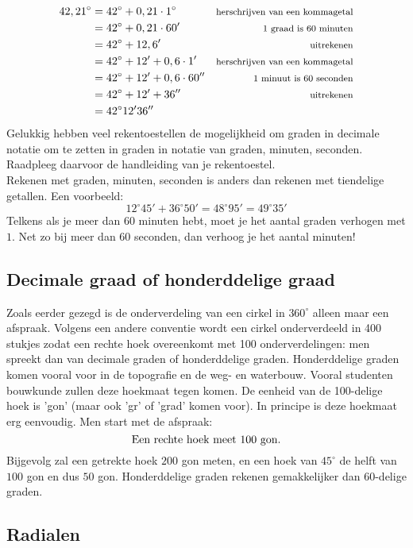 \documentclass[a4paper,12pt]{article}
\begin{document}
\begin{align*}
42,21^\circ &= 42^\circ+0,21\cdot 1^\circ &\textup{\footnotesize herschrijven van een kommagetal}\\
&= 42^\circ + 0,21 \cdot 60' &\textup{\footnotesize 1 graad is 60 minuten}\\
&= 42^\circ + 12,6' &\textup{\footnotesize uitrekenen}\\
&= 42^\circ + 12' + 0,6\cdot 1' &\textup{\footnotesize herschrijven van een kommagetal}\\
&= 42^\circ + 12' + 0,6 \cdot 60'' &\textup{\footnotesize 1 minuut is 60 seconden}\\
&= 42^\circ + 12' + 36'' & \textup{\footnotesize uitrekenen}\\
&= 42^\circ12'36''
\end{align*}
Gelukkig hebben veel rekentoestellen de mogelijkheid om graden in decimale notatie om te zetten in graden in notatie van graden, minuten, seconden. Raadpleeg daarvoor de handleiding van je rekentoestel.\\

Rekenen met graden, minuten, seconden is anders dan rekenen met tiendelige getallen.  Een voorbeeld:
\[12^\circ45'+36^\circ50'=48^\circ95'=49^\circ35'\]
Telkens als je meer dan $60$ minuten hebt, moet je het aantal graden verhogen met $1$. Net zo bij meer dan $60$ seconden, dan verhoog je het aantal minuten!

\subsection{Decimale graad of honderddelige graad}

Zoals eerder gezegd is de onderverdeling van een cirkel in $360^\circ$ alleen maar een afspraak. Volgens een andere conventie wordt een cirkel onderverdeeld in 400 stukjes zodat een rechte hoek overeenkomt met 100 onderverdelingen: men spreekt dan van decimale graden of honderddelige graden.
Honderddelige graden komen vooral voor in de topografie en de weg- en waterbouw. Vooral studenten bouwkunde zullen deze hoekmaat tegen komen. De eenheid van de 100-delige hoek is 'gon' (maar ook 'gr' of 'grad' komen voor). In principe is deze hoekmaat erg eenvoudig. Men start met de afspraak:
\[\textup{Een rechte hoek meet 100 gon.}\]
Bijgevolg zal een getrekte hoek $200$ gon meten, en een hoek van $45^\circ$ de helft van $100$ gon en dus $50$ gon. Honderddelige graden rekenen gemakkelijker dan $60$-delige graden.

\subsection{Radialen}
\end{document}
